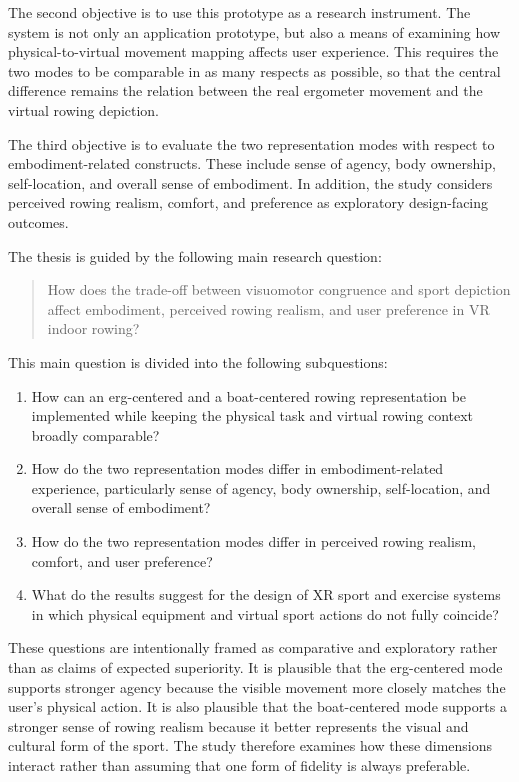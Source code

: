 The second objective is to use this prototype as a research instrument. The system is not only an application prototype, but also a means of examining how physical-to-virtual movement mapping affects user experience. This requires the two modes to be comparable in as many respects as possible, so that the central difference remains the relation between the real ergometer movement and the virtual rowing depiction.

The third objective is to evaluate the two representation modes with respect to embodiment-related constructs. These include sense of agency, body ownership, self-location, and overall sense of embodiment. In addition, the study considers perceived rowing realism, comfort, and preference as exploratory design-facing outcomes.

The thesis is guided by the following main research question:

\begin{quote}
How does the trade-off between visuomotor congruence and sport depiction affect embodiment, perceived rowing realism, and user preference in VR indoor rowing?
\end{quote}

This main question is divided into the following subquestions:

\begin{enumerate}
    \item How can an erg-centered and a boat-centered rowing representation be implemented while keeping the physical task and virtual rowing context broadly comparable?

    \item How do the two representation modes differ in embodiment-related experience, particularly sense of agency, body ownership, self-location, and overall sense of embodiment?

    \item How do the two representation modes differ in perceived rowing realism, comfort, and user preference?

    \item What do the results suggest for the design of XR sport and exercise systems in which physical equipment and virtual sport actions do not fully coincide?
\end{enumerate}

These questions are intentionally framed as comparative and exploratory rather than as claims of expected superiority. It is plausible that the erg-centered mode supports stronger agency because the visible movement more closely matches the user's physical action. It is also plausible that the boat-centered mode supports a stronger sense of rowing realism because it better represents the visual and cultural form of the sport. The study therefore examines how these dimensions interact rather than assuming that one form of fidelity is always preferable.


